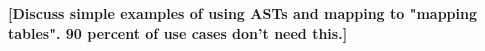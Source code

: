 \documentclass[10pt,letterpaper]{article} %
\newcommand{\stt}[1]{\texttt{#1}} %
\begin{document}

\textbf{[Discuss simple examples of using ASTs and mapping to "mapping tables". 90 percent of use cases don't need this.]}

\end{document}
